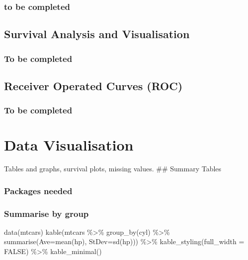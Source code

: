 \documentclass[
]{book}
\newenvironment{Shaded}{\begin{snugshade}}{\end{snugshade}}
\newcommand{\AttributeTok}[1]{\textcolor[rgb]{0.77,0.63,0.00}{#1}}
\newcommand{\ConstantTok}[1]{\textcolor[rgb]{0.00,0.00,0.00}{#1}}
\newcommand{\FunctionTok}[1]{\textcolor[rgb]{0.00,0.00,0.00}{#1}}
\newcommand{\NormalTok}[1]{#1}
\newcommand{\SpecialCharTok}[1]{\textcolor[rgb]{0.00,0.00,0.00}{#1}}
\begin{document}
\hypertarget{to-be-completed-1}{%
\subsection{to be completed}\label{to-be-completed-1}}

\hypertarget{survival-analysis-and-visualisation}{%
\section{Survival Analysis and Visualisation}\label{survival-analysis-and-visualisation}}

\hypertarget{to-be-completed-2}{%
\subsection{To be completed}\label{to-be-completed-2}}

\hypertarget{receiver-operated-curves-roc}{%
\section{Receiver Operated Curves (ROC)}\label{receiver-operated-curves-roc}}

\hypertarget{to-be-completed-3}{%
\subsection{To be completed}\label{to-be-completed-3}}

\hypertarget{data-visualisation}{%
\chapter{Data Visualisation}\label{data-visualisation}}

Tables and graphs, survival plots, missing values.
\#\# Summary Tables

\hypertarget{packages-needed}{%
\subsection{Packages needed}\label{packages-needed}}

\hypertarget{summarise-by-group}{%
\subsection{Summarise by group}\label{summarise-by-group}}

\begin{Shaded}
\begin{Highlighting}[]
\FunctionTok{data}\NormalTok{(mtcars)}
\FunctionTok{kable}\NormalTok{(mtcars }\SpecialCharTok{\%\textgreater{}\%} \FunctionTok{group\_by}\NormalTok{(cyl) }\SpecialCharTok{\%\textgreater{}\%} \FunctionTok{summarise}\NormalTok{(}\AttributeTok{Ave=}\FunctionTok{mean}\NormalTok{(hp), }\AttributeTok{StDev=}\FunctionTok{sd}\NormalTok{(hp))) }\SpecialCharTok{\%\textgreater{}\%} 
  \FunctionTok{kable\_styling}\NormalTok{(}\AttributeTok{full\_width =} \ConstantTok{FALSE}\NormalTok{) }\SpecialCharTok{\%\textgreater{}\%} \FunctionTok{kable\_minimal}\NormalTok{()}
\end{Highlighting}
\end{Shaded}
\end{document}
